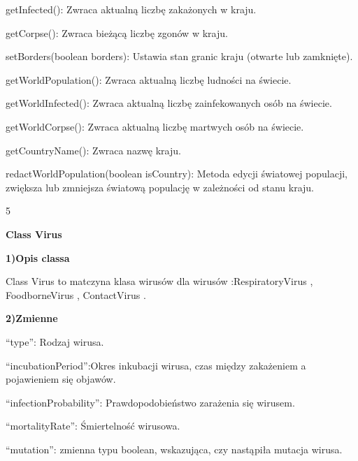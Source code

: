 \documentclass[a4paper]{article}
\begin{document}
\foreignlanguage{polish}{getInfected(): Zwraca aktualną liczbę zakażonych w kraju.}

\foreignlanguage{polish}{getCorpse(): Zwraca bieżącą liczbę zgonów w kraju.}

\foreignlanguage{polish}{setBorders(boolean borders): Ustawia stan granic kraju (otwarte lub zamknięte).}

\foreignlanguage{polish}{getWorldPopulation(): Zwraca aktualną liczbę ludności na świecie.}

\foreignlanguage{polish}{getWorldInfected(): Zwraca aktualną liczbę zainfekowanych osób na świecie.}

\foreignlanguage{polish}{getWorldCorpse(): Zwraca aktualną liczbę martwych osób na świecie.}

\foreignlanguage{polish}{getCountryName(): Zwraca nazwę kraju.}

\foreignlanguage{polish}{redactWorldPopulation(boolean isCountry): Metoda edycji światowej populacji, zwiększa lub
zmniejsza światową populację w zależności od stanu kraju.}


\bigskip
\bigskip
\bigskip
\bigskip
\bigskip
\bigskip
\bigskip
\bigskip
\bigskip
\bigskip
\bigskip
\bigskip
\bigskip
\bigskip
\bigskip
\bigskip
\bigskip



\begin{center}
	5
	\end{center}
\bigskip
\newpage
{\centering
\foreignlanguage{english}{\textbf{Class Virus}}
\par}
\vspace{6pt}
\foreignlanguage{english}{\textbf{1)Opis classa}}

\foreignlanguage{english}{Class Virus to matczyna klasa wirusów dla wirusów :RespiratoryVirus , FoodborneVirus ,
ContactVirus .}


\bigskip

\foreignlanguage{english}{\textbf{2)Zmienne}}

\foreignlanguage{polish}{“type”: Rodzaj wirusa.}

\foreignlanguage{polish}{“incubationPeriod”:Okres inkubacji wirusa, czas między zakażeniem a pojawieniem się objawów.}

\foreignlanguage{polish}{“infectionProbability”: Prawdopodobieństwo zarażenia się wirusem.}

\foreignlanguage{polish}{“mortalityRate”: Śmiertelność wirusowa.}

\foreignlanguage{polish}{“mutation”: zmienna typu boolean, wskazująca, czy nastąpiła mutacja wirusa.}
\end{document}

